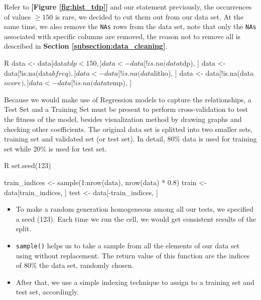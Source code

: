 Refer to \textbf{[Figure \ref{fig:hist_tdp}]} and our statement previously, the occurrences of values $\ge 150$ is rare, we decided to
cut them out from our data set. At the same time, we also remove the \texttt{NAs} rows from the data set, note that only the
\texttt{NAs} associated with specific columns are removed, the reason not to remove all is described in \textbf{Section \ref{subsection:data_cleaning}}.

\begin{code}{R}
    data <- data[data$tdp < 150, ]
    data <- data[!is.na(data$tdp), ]
    data <- data[!is.na(data$bfreq), ]
    data <- data[!is.na(data$litho), ]
    data <- data[!is.na(data$ncore), ]
    data <- data[!is.na(data$temp), ]
\end{code}

Because we would make use of Regression models to capture the relationships, a Test Set and a Training Set must be present to perform 
cross-validation to test the fitness of the model, besides visualization method by drawing graphs and checking other coefficients. The original
data set is splitted into two smaller sets, training set and validated set (or test set). In detail, 80\% data is used for training set while 20\% 
is used for test set.

\begin{code}{R}
set.seed(123)

train_indices <- sample(1:nrow(data), nrow(data) * 0.8)
train <- data[train_indices, ]
test <- data[-train_indices, ]
\end{code}

\begin{itemize}
    \item To make a random generation homogeneous among all our tests, we specified a seed (123). Each time we run the cell, we would get
    consistent results of the split.
    \item \verb|sample()| helps us to take a sample from all the elements of our data set using without replacement. The return value of this function
    are the indices of 80\% the data set, randomly chosen.
    \item After that, we use a simple indexing technique to assign to a training set and test set, accordingly.
\end{itemize}











